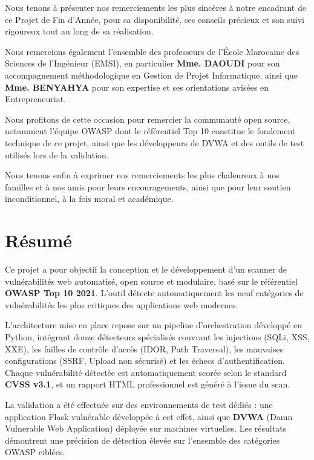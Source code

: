 \documentclass[12pt,a4paper]{report}
\begin{document}
Nous tenons à présenter nos remerciements les plus sincères à notre encadrant de ce Projet
de Fin d'Année, pour sa disponibilité, ses conseils précieux et son suivi rigoureux tout au
long de sa réalisation.

Nous remercions également l'ensemble des professeurs de l'École Marocaine des Sciences
de l'Ingénieur (EMSI), en particulier \textbf{Mme. DAOUDI} pour son accompagnement
méthodologique en Gestion de Projet Informatique, ainsi que \textbf{Mme. BENYAHYA}
pour son expertise et ses orientations avisées en Entrepreneuriat.

Nous profitons de cette occasion pour remercier la communauté open source, notamment
l'équipe OWASP dont le référentiel Top 10 constitue le fondement technique de ce projet,
ainsi que les développeurs de DVWA et des outils de test utilisés lors de la validation.

Nous tenons enfin à exprimer nos remerciements les plus chaleureux à nos familles et à nos
amis pour leurs encouragements, ainsi que pour leur soutien inconditionnel, à la fois
moral et académique.

\clearpage

\chapter*{Résumé}
\thispagestyle{fancy}

Ce projet a pour objectif la conception et le développement d'un scanner de vulnérabilités
web automatisé, open source et modulaire, basé sur le référentiel \textbf{OWASP Top 10 2021}.
L'outil détecte automatiquement les neuf catégories de vulnérabilités les plus critiques des
applications web modernes.

L'architecture mise en place repose sur un pipeline d'orchestration développé en Python,
intégrant douze détecteurs spécialisés couvrant les injections (SQLi, XSS, XXE), les
failles de contrôle d'accès (IDOR, Path Traversal), les mauvaises configurations (SSRF,
Upload non sécurisé) et les échecs d'authentification. Chaque vulnérabilité détectée est
automatiquement scorée selon le standard \textbf{CVSS v3.1}, et un rapport HTML professionnel
est généré à l'issue du scan.

La validation a été effectuée sur des environnements de test dédiés : une application Flask
vulnérable développée à cet effet, ainsi que \textbf{DVWA} (Damn Vulnerable Web Application)
déployée sur machines virtuelles. Les résultats démontrent une précision de détection
élevée sur l'ensemble des catégories OWASP ciblées.
\end{document}
